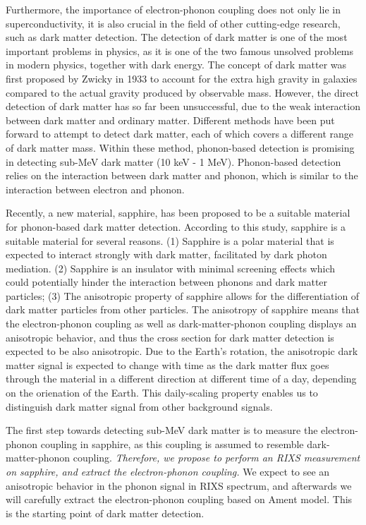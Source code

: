 \documentclass[11pt]{article}
\begin{document}
Furthermore, the importance of electron-phonon coupling does not only lie in superconductivity, it is also crucial in the field of other cutting-edge research, such as dark matter detection. The detection of dark matter is one of the most important problems in physics, as it is one of the two famous unsolved problems in modern physics, together with dark energy. The concept of dark matter was first proposed by Zwicky in 1933 to account for the extra high gravity in galaxies compared to the actual gravity produced by observable mass. However, the direct detection of dark matter has so far been unsuccessful, due to the weak interaction between dark matter and ordinary matter. Different methods have been put forward to attempt to detect dark matter\cite{bergstrom_non-baryonic_2000}, each of which covers a different range of dark matter mass\cite{vogel_dark_2014,essig_first_2012,davidson_updated_2000}. Within these method, phonon-based detection is promising in detecting sub-MeV dark matter (10 keV - 1 MeV). Phonon-based detection relies on the interaction between dark matter and phonon, which is similar to the interaction between electron and phonon\cite{griffin_directional_2018}. 

Recently, a new material, sapphire, has been proposed to be a suitable material for phonon-based dark matter detection\cite{griffin_directional_2018}. According to this study, sapphire is a suitable material for several reasons. (1) Sapphire is a polar material that is expected to interact strongly with dark matter, facilitated by dark photon mediation. (2) Sapphire is an insulator with minimal screening effects which could potentially hinder the interaction between phonons and dark matter particles; (3)  The anisotropic property of sapphire allows for the differentiation of dark matter particles from other particles. The anisotropy of sapphire means that the electron-phonon coupling as well as dark-matter-phonon coupling displays an anisotropic behavior\cite{griffin_directional_2018}, and thus the cross section for dark matter detection is expected to be also anisotropic. Due to the Earth's rotation, the anisotropic dark matter signal is expected to change with time as the dark matter flux goes through the material in a different direction at different time of a day, depending on the orienation of the Earth. This daily-scaling property enables us to distinguish dark matter signal from other background signals. 

The first step towards detecting sub-MeV dark matter is to measure the electron-phonon coupling in sapphire, as this coupling is assumed to resemble dark-matter-phonon coupling. \textit{Therefore, we propose to perform an RIXS measurement on sapphire, and extract the electron-phonon coupling.}  We expect to see an anisotropic behavior in the phonon signal in RIXS spectrum, and afterwards we will carefully extract the electron-phonon coupling based on Ament model\cite{ament_determining_2011}. This is the starting point of dark matter detection.
\end{document}

